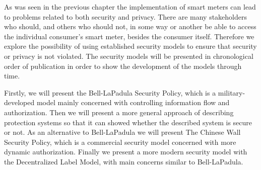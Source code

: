 
As was seen in the previous chapter the implementation of smart meters can lead to problems related to both security and privacy.
There are many stakeholders who should, and others who should not, in some way or another be able to access the individual consumer's smart meter, besides the consumer itself.
Therefore we explore the possibility of using established security models to ensure that security or privacy is not violated.
The security models will be presented in chronological order of publication in order to show the development of the models through time.

Firstly, we will present the Bell-LaPadula Security Policy, which is a military-developed model mainly concerned with controlling information flow and authorization.
Then we will present a more general approach of describing protection systems so that it can showed whether the described system is secure or not.
As an alternative to Bell-LaPadula we will present The Chinese Wall Security Policy, which is a commercial security model concerned with more dynamic authorization.
Finally we present a more modern security model with the Decentralized Label Model, with main concerns similar to Bell-LaPadula.
